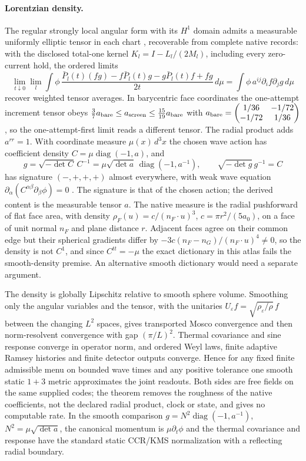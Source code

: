 \documentclass[11pt]{article}
\theoremstyle{definition}
\theoremstyle{remark}
\theoremstyle{plain}
\newcommand{\diag}{\operatorname{diag}}
\begin{document}
\paragraph{Lorentzian density.}
The regular strongly local angular form with its $H^1$ domain admits a
measurable uniformly elliptic tensor in each chart
\cite[Theorem 7.2 and Corollary 7.3]{pwcipriani2006dirichlet}, recoverable
from complete native records: with the disclosed total-one kernel
$K_l=I-L_l/(2M_l)$, including every zero-current hold, the ordered limits
\[
 \lim_{t\downarrow0}\lim_l\int\phi\,
 \frac{\bar P_l(t)(fg)-f\bar P_l(t)g-g\bar P_l(t)f+fg}{2t}\,d\mu
 =\int\phi\,a^{ij}\partial_i f\partial_j g\,d\mu
\]
recover weighted tensor averages. In barycentric face coordinates the
one-attempt increment tensor obeys
$\tfrac37a_{\rm bare}\le a_{\rm screen}\le\tfrac{15}{19}a_{\rm bare}$ with
$a_{\rm bare}=\begin{pmatrix}1/36&-1/72\\-1/72&1/36\end{pmatrix}$, so the
one-attempt-first limit reads a different tensor. The radial product adds
$a^{rr}=1$. With coordinate measure $\mu(x)\,d^3x$ the chosen wave action
has coefficient density $C=\mu\diag(-1,a)$, and
\[
 g=\sqrt{-\det C}\,C^{-1}
   =\mu\sqrt{\det a}\,\diag(-1,a^{-1}),
 \qquad \sqrt{-\det g}\,g^{-1}=C
\]
has signature $(-,+,+,+)$ almost everywhere, with weak wave equation
$\partial_\alpha(C^{\alpha\beta}\partial_\beta\phi)=0$
\cite[Equations (23)--(26)]{pwvisser1998acoustic}. The signature is that of
the chosen action; the derived content is the measurable tensor $a$. The
native measure is the radial pushforward of flat face area, with density
$\rho_F(u)=c/(n_F\cdot u)^3$, $c=\pi r^2/(5a_0)$, on a face of unit normal
$n_F$ and plane distance $r$. Adjacent faces agree on their common edge but
their spherical gradients differ by $-3c(n_F-n_G)/(n_F\cdot u)^4\ne0$, so the
density is not $C^1$, and since $C^{tt}=-\mu$ the exact dictionary in this
atlas fails the smooth-density premise. An alternative smooth dictionary
would need a separate argument.

The density is globally Lipschitz relative to smooth sphere volume. Smoothing
only the angular variables and the tensor, with the unitaries
$U_\varepsilon f=\sqrt{\rho_\varepsilon/\rho}\,f$ between the changing $L^2$
spaces, gives transported Mosco convergence and then norm-resolvent
convergence with gap $(\pi/L)^2$. Thermal covariance and sine response
converge in operator norm, and ordered Weyl laws, finite adaptive Ramsey
histories and finite detector outputs converge. Hence for any fixed finite
admissible menu on bounded wave times and any positive tolerance one smooth
static $1+3$ metric approximates the joint readouts. Both sides are free
fields on the same supplied codes; the theorem removes the roughness of the
native coefficients, not the declared radial product, clock or state, and
gives no computable rate. In the smooth comparison $g=N^2\diag(-1,a^{-1})$,
$N^2=\mu\sqrt{\det a}$, the canonical momentum is $\mu\partial_t\phi$ and
the thermal covariance and response have the standard static CCR/KMS
normalization with a reflecting radial boundary.
\end{document}
